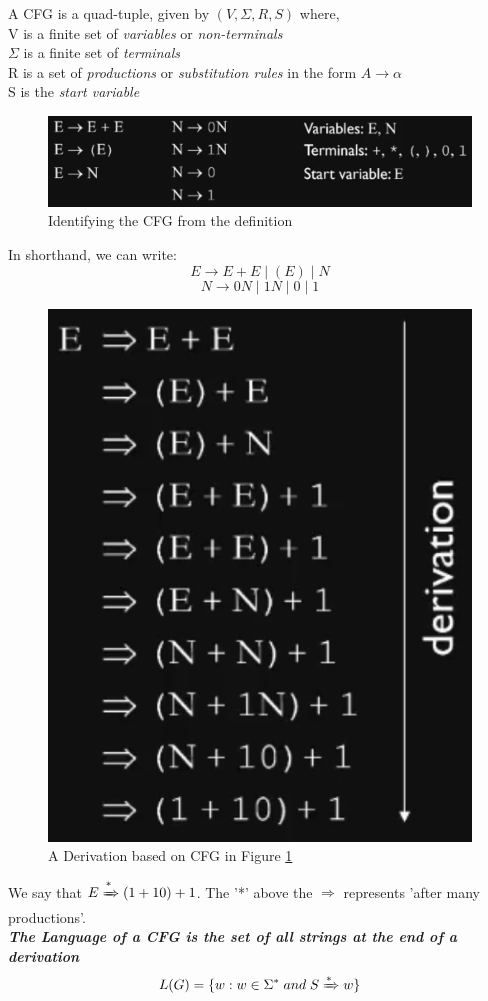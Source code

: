 \documentclass{article}
\begin{document}
    A CFG is a quad-tuple, given by $(V, \Sigma, R, S)$ where,\\
    V is a finite set of \emph{variables} or \emph{non-terminals}\\
    $\Sigma$ is a finite set of \emph{terminals}\\
    R is a set of \emph{productions} or \emph{substitution rules} in the form $A\to \alpha$\\
    S is the \emph{start variable}
    \begin{figure}[h]
        \centerline{
            \includegraphics[scale=0.3]{Example CFG 1.png}
        }
        \caption{Identifying the CFG from the definition}
        \label{CFG 1}
    \end{figure}
    
    In shorthand, we can write:
    $$E\to E+E\;|\;(E)\;|\;N$$
    $$N\to 0N\;|\;1N\;|\;0\;|\;1$$

    \begin{figure}[h]
        \centerline{
            \includegraphics[scale=0.25]{Derivation.png}
        }
        \caption{A Derivation based on CFG in Figure \ref{CFG 1}}
    \end{figure}
    We say that $E\xRightarrow{\text{*}} (1+10)+1$. The '*' above the $\Rightarrow$ represents 'after many productions'.
    \\
    \textbf{\emph{The Language of a CFG is the set of all strings at the end of a derivation}}
    $$L(G)=\{w:w\in \Sigma^*\;and\;S\xRightarrow{*}w\}$$
    
\end{document}
